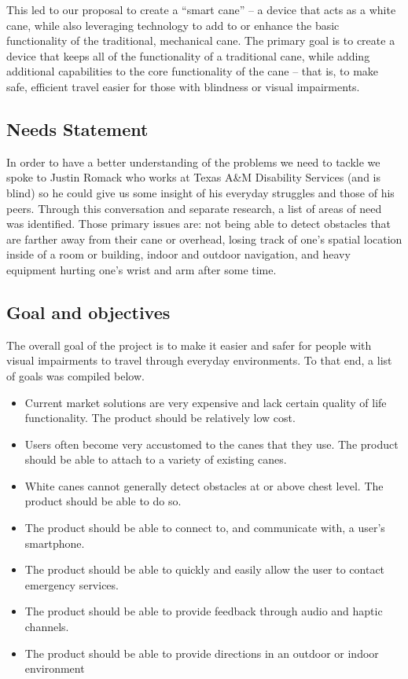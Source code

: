 \documentclass[letterpaper,12pt]{article}
\begin{document}
This led to our proposal to create a “smart cane” – a device that acts as a white cane, while also leveraging technology to add to or enhance the basic functionality of the traditional, mechanical cane. The primary goal is to create a device that keeps all of the functionality of a traditional cane, while adding additional capabilities to the core functionality of the cane – that is, to make safe, efficient travel easier for those with blindness or visual impairments. \par

\subsection{Needs Statement}
In order to have a better understanding of the problems we need to tackle we spoke to Justin Romack who works at Texas A\&M Disability Services (and is blind) so he could give us some insight of his everyday struggles and those of his peers. Through this conversation and separate research, a list of areas of need was identified. Those primary issues are: not being able to detect obstacles that are farther away from their cane or overhead, losing track of one’s spatial location inside of a room or building, indoor and outdoor navigation, and heavy equipment hurting one’s wrist and arm after some time.


\subsection{Goal and objectives}

The overall goal of the project is to make it easier and safer for people with visual impairments to travel through everyday environments. To that end, a list of goals was compiled below.\par
\begin{itemize}
    \item Current market solutions are very expensive and lack certain quality of life functionality. The product should be relatively low cost.
    \item Users often become very accustomed to the canes that they use. The product should be able to attach to a variety of existing canes.
    \item White canes cannot generally detect obstacles at or above chest level. The product should be able to do so.
    \item The product should be able to connect to, and communicate with, a user’s smartphone.
    \item The product should be able to quickly and easily allow the user to contact emergency services.
    \item The product should be able to provide feedback through audio and haptic channels.
    \item The product should be able to provide directions in an outdoor or indoor environment
\end{itemize}
\end{document}
